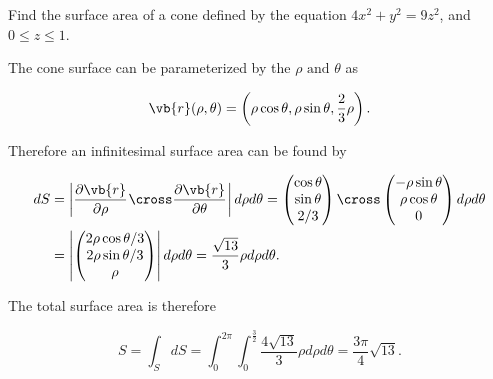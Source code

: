 \documentclass[english,a4paper,12pt]{report}
\begin{document}
{Find the surface area of a cone defined by the equation \(4x^2+y^2=9z^2\), and \(0 \le z \le 1\).  }
{The cone surface can be parameterized by the \(\rho \text { and } \theta \) as

\begin{equation}
	\vb{r} (\rho ,\theta) = \left(\rho \cos \theta ,\rho \sin \theta ,\frac{2}{3}\rho  \right).
\end{equation}

Therefore an infinitesimal surface area can be found by 

\begin{equation}
	\begin{aligned} 
	dS &= \left| \frac{\partial \vb{r} }{\partial \rho } _{} \cross  \frac{\partial \vb{r} }{\partial \theta }_{} \right| d\rho d\theta  = \begin{pmatrix}
		 \cos \theta  \\
		 \sin \theta  \\
		 2/3  \\
	\end{pmatrix} \cross \begin{pmatrix}
		 -\rho \sin \theta  \\
		 \rho \cos \theta  \\
		 0 \\
	\end{pmatrix} d \rho d \theta \\
	&= \left| \begin{pmatrix}
		 2\rho \cos  \theta /3  \\
		 2\rho \sin \theta /3  \\
		 \rho  \\
	\end{pmatrix} \right| d \rho d \theta = \frac{\sqrt{13} }{3} \rho d \rho d \theta .  
	\end{aligned} 
\end{equation}

The total surface area is therefore 

\begin{equation}
	S = \int_{S}^{} dS = \int_{0}^{2\pi } \int_{0}^{\frac{3}{2} } \frac{4\sqrt{13} }{3} \rho d \rho d \theta = \frac{3\pi }{4} \sqrt{13}.    
\end{equation}
~
} 
\end{document}
